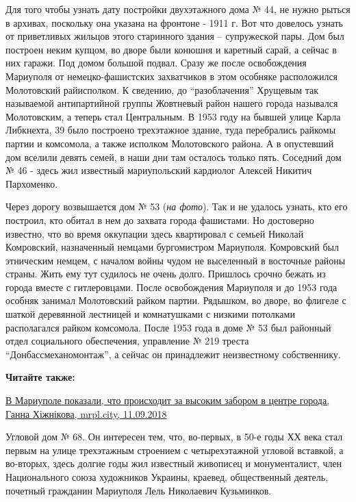 
Для того чтобы узнать дату постройки двухэтажного дома № 44, не нужно рыться в
архивах, поскольку она указана на фронтоне - 1911 г. Вот что довелось узнать от
приветливых жильцов этого старинного здания – супружеской пары. Дом был
построен неким купцом, во дворе были конюшня и каретный сарай, а сейчас в них
гаражи. Под домом большой подвал. Сразу же после освобождения Мариуполя от
немецко-фашистских захватчиков в этом особняке расположился Молотовский
райисполком. К сведению, до \enquote{разоблачения} Хрущевым так называемой
антипартийной группы Жовтневый район нашего города назывался Молотовским, а
теперь стал Центральным. В 1953 году на бывшей улице Карла Либкнехта, 39 было
построено трехэтажное здание, туда перебрались райкомы партии и комсомола, а
также исполком Молотовского района. А в опустевший дом вселили девять семей, в
наши дни там осталось только пять. Соседний дом № 46 - здесь жил известный
мариупольский кардиолог Алексей Никитич Пархоменко.


Через дорогу возвышается дом № 53 (\emph{на фото}). Так и не удалось узнать, кто его
построил, кто обитал в нем до захвата города фашистами. Но достоверно известно,
что во время оккупации здесь квартировал с семьей Николай Комровский,
назначенный немцами бургомистром Мариуполя. Комровский был этническим немцем, с
началом войны чудом не выселенный в восточные районы страны. Жить ему тут
судилось не очень долго. Пришлось срочно бежать из города вместе с
гитлеровцами. После освобождения Мариуполя и до 1953 года особняк занимал
Молотовский райком партии. Рядышком, во дворе, во флигеле с шаткой деревянной
лестницей и комнатушками с низкими потолками располагался райком комсомола.
После 1953 года в доме № 53 был районный отдел социального обеспечения,
управление № 219 треста \enquote{Донбассмеханомонтаж}, а сейчас он принадлежит
неизвестному собственнику.

\textbf{Читайте также:} 

\href{https://mrpl.city/news/view/v-mariupole-pokazali-chto-proishodit-za-vysokim-zaborom-v-tsentre-goroda-foto}{%
В Мариуполе показали, что происходит за высоким забором в центре города, Ганна Хіжнікова, mrpl.city, 11.09.2018}

Угловой дом № 68. Он интересен тем, что, во-первых, в 50-е годы ХХ века стал
первым на улице трехэтажным строением с четырехэтажной угловой вставкой, а
во-вторых, здесь долгие годы жил известный живописец и монументалист, член
Национального союза художников Украины, краевед, общественный деятель, почетный
гражданин Мариуполя Лель Николаевич Кузьминков.

